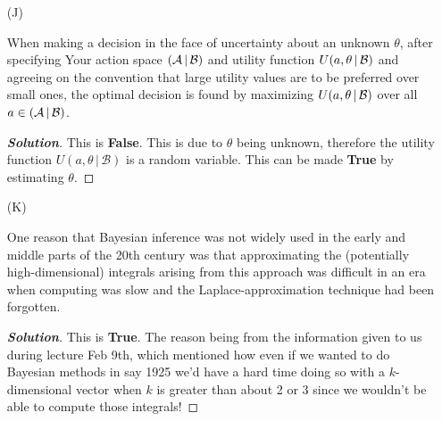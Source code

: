 \documentclass[12pt]{article}
\newcommand{\given}{\, | \,}
\newenvironment{solution}{\begin{proof}[\textbf{\textit{Solution}}] }{\end{proof}}
\begin{document}
\begin{itemize}
The kind of objectivity in probability assessment sought by people like
Venn, in which all reasonable people would agree on the assessed value, is
often impossible to achieve, because all such assessments are conditional
on the (1) assumptions, (2) judgments and (3) background information of the
person making the probability assessment, and different reasonable people
can differ along any of those three dimensions.
\begin{tcolorbox}[breakable]
    \begin{solution}
        This is \textbf{True}. What Venn and other were trying to achieve may be noble, it was still impossible. Since in their paradigm they are simply tucking away the subjectivity. Their assumptions and judgments are more clear when we consider the population when we have to choose our population under the idea of  "similar in all relevant ways". Meaning all probability models are subjective. 
    \end{solution}    
\end{tcolorbox}

\item[(J)]

When making a decision in the face of uncertainty about an unknown $\theta$, after specifying Your action space $( { \cal A } \given { \cal B } )$ and utility function $U ( a, \theta \given { \cal B } )$ and agreeing on the convention that large utility values are to be preferred over small ones, the optimal decision is found by maximizing $U ( a, \theta \given { \cal B } )$ over all $a \in ( { \cal A } \given { \cal B } )$.
\begin{tcolorbox}[breakable]
    \begin{solution}
        This is \textbf{False}. This is due to $\theta$ being unknown, therefore the utility function $U(a,\theta\given \mathcal{B})$ is a random variable. This can be made \textbf{True} by estimating $\theta$.
    \end{solution}
\end{tcolorbox}


\item[(K)]

One reason that Bayesian inference was not widely used in the early and middle parts of
the 20th century was that approximating the (potentially high-dimensional)
integrals arising from this approach was difficult in an era when computing
was slow and the Laplace-approximation technique had been forgotten.
\begin{tcolorbox}[breakable]
    \begin{solution}
        This is \textbf{True}. The reason being from the information given to us during lecture Feb 9th, which mentioned how even if we wanted to do Bayesian methods in say 1925 we'd have a hard time doing so with a $k$-dimensional vector when $k$ is greater than about 2 or 3 since we wouldn't be able to compute those integrals!
    \end{solution}
\end{tcolorbox}



\end{itemize}
\end{document}
